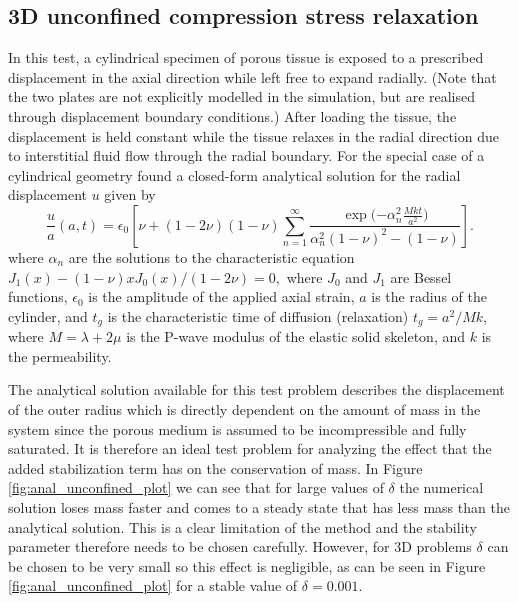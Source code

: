 
\subsection{3D unconfined compression stress relaxation}
\label{sec:unconfined}
In this test, a cylindrical specimen of porous tissue is exposed to a prescribed displacement in the axial direction while left free to expand radially. (Note that the two plates are not explicitly modelled in the simulation, but are realised through displacement boundary conditions.) After loading the tissue, the displacement is held constant while the tissue relaxes in the radial direction due to interstitial fluid flow through the radial boundary. For the special case of a cylindrical geometry \cite{armstrong1984analysis} found a closed-form analytical solution for the radial displacement $u$ given by
\begin{equation}
 \frac{u}{a}(a,t)=\epsilon_{0}\left[ \nu + (1-2\nu)(1-\nu) \sum^{\infty}_{n=1}\frac{\exp{( -\alpha_n^{2} \frac{M k t}{a^{2}}}) }{ \alpha_{n}^{2}(1-\nu)^{2}-(1-\nu) }  \right].
\end{equation}
where $\alpha_n$ are the solutions to the characteristic equation $J_{1}(x)-(1-\nu)xJ_{0}(x)/(1-2\nu)=0,$ where $J_{0}$ and $J_{1}$ are Bessel functions, $\epsilon_{0}$ is the amplitude of the applied axial strain, $a$ is the radius of the cylinder, and $t_{g}$ is the characteristic time of diffusion (relaxation) $t_{g}= a^{2}/M k$, where $M=\lambda + 2\mu$ is the P-wave modulus of the elastic solid skeleton, and $k$ is the permeability.


The analytical solution available for this test problem describes the displacement of the outer radius which is directly dependent on the amount of mass in the system since the porous medium is assumed to be incompressible and fully saturated. It is therefore an ideal test problem for analyzing the effect that the added stabilization term has on the conservation of mass. In Figure \ref{fig:anal_unconfined_plot} we can see that for large values of $\delta$ the numerical solution loses mass faster and comes to a steady state that has less mass than the analytical solution. This is a clear limitation of the method and the stability parameter therefore needs to be chosen carefully. However, for 3D problems $\delta$ can be chosen to be very small so this effect is negligible, as can be seen in Figure \ref{fig:anal_unconfined_plot} for a stable value of $\delta=0.001$.


